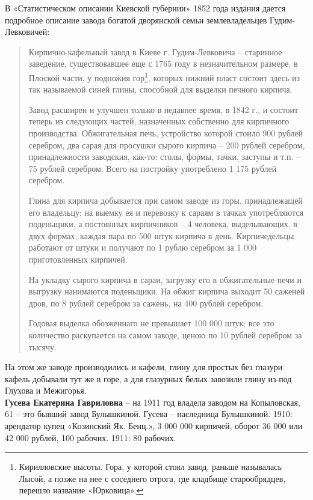 В «Статистическом описании Киевской губернии»\cite{fundstat} 1852 года издания дается подробное описание завода богатой дворянской семьи землевладельцев Гудим-Левковичей:

\begin{quotation}
Кирпично-кафельный завод в Киеве г. Гудим-Левковича – старинное заведение, существовавшее еще с 1765 году в незначительном размере, в Плоской части, у подножия гор\footnote{Кирилловские высоты. Гора, у которой стоял завод, раньше называлась Лысой, а позже на нее с соседнего отрога, где кладбище старообрядцев, перешло название «Юрковица».}, которых нижний пласт состоит здесь из так называемой синей глины, способной для выделки печного кирпича.

Завод расширен и улучшен только в недавнее время, в 1842 г., и состоит теперь из следующих частей, назначенных собственно для кирпичного производства. Обжигательная печь, устройство которой стоило 900 рублей серебром, два сарая для просушки сырого кирпича – 200 рублей серебром, принадлежности заводския, как-то: столы, формы, тачки, заступы и т.п. – 75 рублей серебром. Всего на постройку употреблено 1 175 рублей серебром.

Глина для кирпича добывается при самом заводе из горы, принадлежащей его владельцу; на выемку ея и перевозку к сараям в тачках употребляются поденьщики, а постоянных кирпичников – 4 человека, выделывающих, в двух формах, каждая пара по 500 штук кирпича в день. Кирпичедельцы работают от штуки и получают по 1 рублю серебром за 1 000 приготовленных кирпичей. 

На укладку сырого кирпича в сараи, загрузку его в обжигательные печи и выгрузку нанимаются поденьщики. На обжиг кирпича выходит 50 саженей дров, по 8 рублей серебром за сажень, на 400 рублей серебром.

Годовая выделка обозженнаго не превышает 100 000 штук; все это количество раскупается на самом заводе, ценою по 10 рублей серебром за тысячу.
\end{quotation}

На этом же заводе производились и кафели, глину для простых без глазури кафель добывали тут же в горе, а для глазурных белых завозили глину из-под Глухова и Межигорья.\\

\noindent\textbf{Гусева Екатерина Гавриловна} – на 1911 год владела заводом на Копыловская, 61 – это бывший завод Булышкиной. Гусева – наследница Булышкиной. 1910: арендатор купец «Козинский Як. Бенц.», 3 000 000 кирпичей, оборот 36 000 или 42 000 рублей, 100 рабочих. 1911: 80 рабочих.\\

